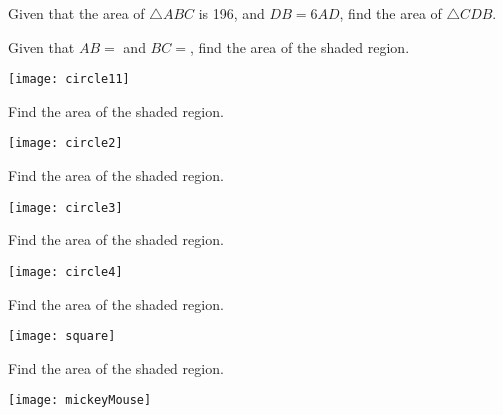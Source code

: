 	\clearpage
	\begin{problem}
	Given that the area of $\triangle ABC$ is 196, and $DB = 6AD$, find the area of $\triangle CDB$.
	\begin{center}
	\end{center}
	\end{problem}
	
	\vspace{0.5in}
	
	\begin{problem}
	Given that $AB=$ and $BC=$, find the area of the shaded region.
	\begin{center}
		\texttt{[image: circle11]}
	\end{center}
	\end{problem}
	
	\vspace{0.6in}
	
	\begin{problem}
	Find the area of the shaded region.
	\begin{center}
		\texttt{[image: circle2]}
	\end{center}
	\end{problem}
	
	\clearpage
	\begin{problem}
	Find the area of the shaded region.
	\begin{center}
		\texttt{[image: circle3]}
	\end{center}
	\end{problem}
	
	\vspace{1.5in}
	
	\begin{problem}
	Find the area of the shaded region.
	\begin{center}
		\texttt{[image: circle4]}
	\end{center}
	\end{problem}
	
	\clearpage
	\begin{problem}
	Find the area of the shaded region.
	\begin{center}
		\texttt{[image: square]}
	\end{center}
	\end{problem}
	
	\vspace{1in}
	
	\begin{problem}
	Find the area of the shaded region.
	\begin{center}
		\texttt{[image: mickeyMouse]}
	\end{center}
	\end{problem}
